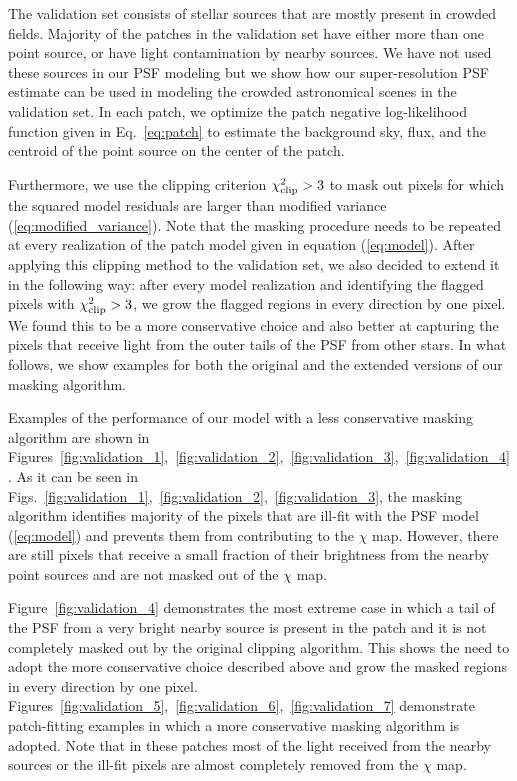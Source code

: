 The validation set consists of stellar sources that are mostly present in crowded fields. Majority of the patches in the validation set have either more than 
one point source, or have light contamination by nearby sources. We have not used these sources in our PSF modeling but we show how our super-resolution PSF estimate 
can be used in modeling the crowded astronomical scenes in the validation set. In each patch, we optimize the patch negative log-likelihood function given in Eq.~\ref{eq:patch} to 
estimate the background sky, flux, and the centroid of the point source on the center of the patch. 

Furthermore, we use the clipping criterion $\chi^{2}_{\rm clip}>3$ to mask out pixels for which the squared model residuals are larger than modified variance (\ref{eq:modified_variance}).
Note that the masking procedure needs to be repeated at every realization of the patch model given in equation (\ref{eq:model}). After applying this clipping method to the validation set, we also decided to extend it in the following way: after every model realization and identifying the flagged pixels with $\chi^{2}_{\rm clip}>3$, we grow the flagged regions 
in every direction by one pixel. We found this to be a more conservative choice and also better at capturing the pixels that receive light from the outer tails of the PSF from other stars. In what follows, we show examples for both the original and the extended versions of our masking algorithm.

Examples of the performance of our model with a less conservative masking algorithm are shown in Figures~\ref{fig:validation_1},~\ref{fig:validation_2},~\ref{fig:validation_3},~\ref{fig:validation_4}. As it can be seen in Figs.~\ref{fig:validation_1},~\ref{fig:validation_2},~\ref{fig:validation_3}, the masking algorithm identifies majority of the pixels that are ill-fit with the PSF model (\ref{eq:model}) and prevents them from contributing to the $\chi$ map. However, there are still pixels that receive a small fraction of their brightness from the nearby point sources and are not masked out of the $\chi$ map. 

Figure~\ref{fig:validation_4} demonstrates the most extreme case in which a tail of the PSF from a very bright nearby source is present in the patch and it is not completely masked out by the original clipping algorithm. This shows the need to adopt the more 
conservative choice described above and grow the masked regions in every direction by one pixel.
Figures~\ref{fig:validation_5},~\ref{fig:validation_6},~\ref{fig:validation_7} demonstrate patch-fitting examples in which a more conservative masking algorithm is adopted. Note that in these patches most of the light received from the nearby sources or the ill-fit pixels are almost completely removed from the $\chi$ map.

